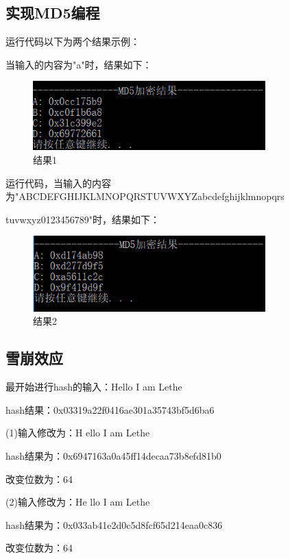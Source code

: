 \documentclass[UTF8,a4paper]{article}
\begin{document}
\subsection{实现MD5编程}	
运行代码以下为两个结果示例：\par 
当输入的内容为"a"时，结果如下：\par 
\begin{figure}[!ht]
	
	\centering
	\includegraphics[width=0.8\textwidth]{r2.PNG}
	\caption{结果1}
	\label{fig:p3}
	\end{figure}
运行代码，当输入的内容为"ABCDEFGHIJKLMNOPQRSTUVWXYZabcdefghijklmnopqrs\par 
tuvwxyz0123456789"时，结果如下：\par 
\begin{figure}[!ht]
	
	\centering
	\includegraphics[width=0.8\textwidth]{r1.PNG}
	\caption{结果2}
	\label{fig:p3}
\end{figure}
\newpage
\subsection{雪崩效应}	
最开始进行hash的输入：Hello I am Lethe\par 

hash结果：0x03319a22f0416ae301a35743bf5d6ba6\par 

(1)输入修改为：H ello I am Lethe\par 
hash结果为：0x6947163a0a45ff14decaa73b8efd81b0\par 
改变位数为：64\par 



(2)输入修改为：He llo I am Lethe

hash结果为：0x033ab41e2d0c5d8fcf65d214eaa0c836\par 
改变位数为：64\par 
\end{document}
